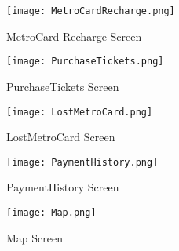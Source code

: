 \documentclass[a4paper,12pt]{report}
\begin{document}
\begin{figure}[h!]
  \centering
   \texttt{[image: MetroCardRecharge.png]}
  \caption{MetroCard Recharge Screen}
\end{figure}

\begin{figure}[h!]
  \centering
   \texttt{[image: PurchaseTickets.png]}
  \caption{PurchaseTickets Screen}
\end{figure}

\begin{figure}[h!]
  \centering
   \texttt{[image: LostMetroCard.png]}
  \caption{LostMetroCard Screen}
\end{figure}

\begin{figure}[h!]
  \centering
   \texttt{[image: PaymentHistory.png]}
  \caption{PaymentHistory Screen}
\end{figure}

\begin{figure}[h!]
  \centering
   \texttt{[image: Map.png]}
  \caption{Map Screen}
\end{figure}
\end{document}
